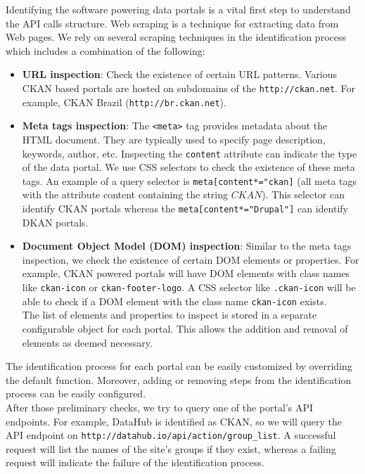 \documentclass[runningheads,a4paper]{llncs}
\begin{document}
Identifying the software powering data portals is a vital first step to understand the API calls structure. Web scraping is a technique for extracting data from Web pages. We rely on several scraping techniques in the identification process which includes a combination of the following:

\begin{itemize}
  \item \textbf{URL inspection}: Check the existence of certain URL patterns. Various CKAN based portals are hosted on subdomains of the \texttt{http://ckan.net}. For example, CKAN Brazil (\texttt{http://br.ckan.net}).
  \item \textbf{Meta tags inspection}: The \texttt{<meta>} tag provides metadata about the HTML document. They are typically used to specify page description, keywords, author, etc. Inspecting the \texttt{content} attribute can indicate the type of the data portal. We use CSS selectors to check the existence of these meta tags. An example of a query selector is \texttt{meta[content*="ckan]} (all meta tags with the attribute content containing the string $CKAN$). This selector can identify CKAN portals whereas the \texttt{meta[content*="Drupal"]} can identify DKAN portals.
  \item \textbf{Document Object Model (DOM) inspection}: Similar to the meta tags inspection, we check the existence of certain DOM elements or properties. For example, CKAN powered portals will have DOM elements with class names like \texttt{ckan-icon} or \texttt{ckan-footer-logo}. A CSS selector like \texttt{.ckan-icon} will be able to check if a DOM element with the class name \texttt{ckan-icon} exists.\\
  The list of elements and properties to inspect is stored in a separate configurable object for each portal. This allows the addition and removal of elements as deemed necessary.
\end{itemize}

The identification process for each portal can be easily customized by overriding the default function. Moreover, adding or removing steps from the identification process can be easily configured.\\
After those preliminary checks, we try to query one of the portal's API endpoints. For example, DataHub is identified as CKAN, so we will query the API endpoint on \texttt{http://datahub.io/api/action/group\_list}. A successful request will list the names of the site's groups if they exist, whereas a failing request will indicate the failure of the identification process.
\end{document}
